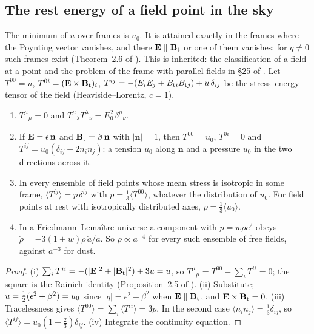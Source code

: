 \subsection{The rest energy of a field point in the sky}
\label{e7:sec:point}

The minimum of $u$ over frames is $u_0$. It is attained exactly in the frames where the Poynting vector vanishes, and there $\mathbf E\parallel\mathbf B_{\rm t}$
or one of them vanishes; for $q\neq0$ such frames exist (Theorem~2.6 of \cite{RE}). This is inherited: the classification of a field at a point
\cite{Synge56} and the problem of the frame with parallel fields in \S25 of \cite{LandauLifshitz2}. Let
$T^{00}=u$, $T^{0i}=(\mathbf E\times\mathbf B_{\rm t})_i$, $T^{ij}=-(E_iE_j+B_{{\rm t}i}B_{{\rm t}j})+u\,\delta_{ij}$ be the stress--energy tensor of the field
(Heaviside--Lorentz, $c=1$).

\begin{proposition}
\label{e7:prop:stress}
\begin{enumerate}[label=(\roman*),leftmargin=2.2em]
\item $T^\mu{}_\mu=0$ and $T^\mu{}_\lambda T^\lambda{}_\nu=E_0^2\,\delta^\mu{}_\nu$.
\item If $\mathbf E=\epsilon\,\mathbf n$ and $\mathbf B_{\rm t}=\beta\,\mathbf n$ with $|\mathbf n|=1$, then $T^{00}=u_0$, $T^{0i}=0$ and $T^{ij}=u_0(\delta_{ij}-2n_in_j)$:
a tension $u_0$ along $\mathbf n$ and a pressure $u_0$ in the two directions across it.
\item In every ensemble of field points whose mean stress is isotropic in some frame, $\langle T^{ij}\rangle=p\,\delta^{ij}$ with
$p=\tfrac13\langle T^{00}\rangle$, whatever the distribution of $u_0$. For field points at rest with isotropically distributed axes,
$p=\tfrac13\langle u_0\rangle$.
\item In a Friedmann--Lema\^itre universe a component with $p=w\rho c^2$ obeys $\dot\rho=-3(1+w)\rho\,\dot a/a$. So $\rho\propto a^{-4}$ for every
such ensemble of free fields, against $a^{-3}$ for dust.
\end{enumerate}
\end{proposition}

\begin{proof}
(i) $\sum_iT^{ii}=-(|\mathbf E|^2+|\mathbf B_{\rm t}|^2)+3u=u$, so $T^\mu{}_\mu=T^{00}-\sum_iT^{ii}=0$; the square is the Rainich identity (Proposition~2.5 of
\cite{RE}). (ii) Substitute; $u=\tfrac12(\epsilon^2+\beta^2)=u_0$ since $|q|=\epsilon^2+\beta^2$ when $\mathbf E\parallel\mathbf B_{\rm t}$, and $\mathbf E\times\mathbf B_{\rm t}=0$.
(iii) Tracelessness gives $\langle T^{00}\rangle=\sum_i\langle T^{ii}\rangle=3p$. In the second case $\langle n_in_j\rangle=\tfrac13\delta_{ij}$, so
$\langle T^{ij}\rangle=u_0(1-\tfrac23)\delta_{ij}$. (iv) Integrate the continuity equation.
\end{proof}

